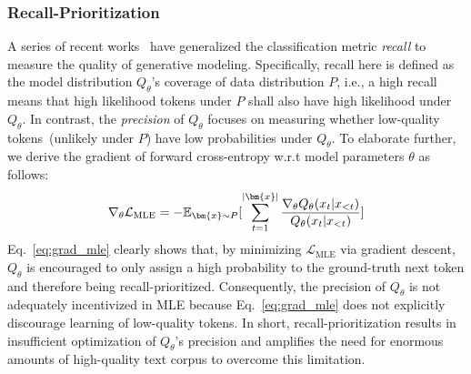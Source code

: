 \subsubsection{Recall-Prioritization}

A series of recent works~\citep{lucic2018gans,sajjadi2018assessing,djolonga2020precision} have generalized the classification metric \textit{recall} to measure the quality of generative modeling. Specifically, recall here is defined as the model distribution $Q_{\theta}$'s coverage of data distribution $P$, i.e., a high recall means that high likelihood tokens under $P$ shall also have high likelihood under $Q_{\theta}$. In contrast, the \textit{precision} of $Q_{\theta}$ focuses on measuring whether low-quality tokens~(unlikely under $P$) have low probabilities under $Q_{\theta}$. To elaborate further, we derive the gradient of forward cross-entropy w.r.t model parameters $\theta$ as follows:
\begin{equation}
    \nabla_{\theta}\mathcal{L}_{\text{MLE}}=-\mathbb{E}_{\bm{x}\sim P}[\sum_{t=1}^{|\bm{x}|}\frac{\nabla_{\theta}Q_{\theta}(x_t|x_{<t})}{Q_{\theta}(x_t|x_{<t})}] \\
    \label{eq:grad_mle}
\end{equation}
Eq.~\ref{eq:grad_mle} clearly shows that, by minimizing $\mathcal{L}_{\text{MLE}}$ via gradient descent, $Q_{\theta}$ is encouraged to only assign a high probability to the ground-truth next token and therefore being recall-prioritized. Consequently, the precision of $Q_{\theta}$ is not adequately incentivized in MLE because Eq.~\ref{eq:grad_mle} does not explicitly discourage learning of low-quality tokens. In short, recall-prioritization results in insufficient optimization of $Q_{\theta}$'s precision and amplifies the need for enormous amounts of high-quality text corpus to overcome this limitation.
